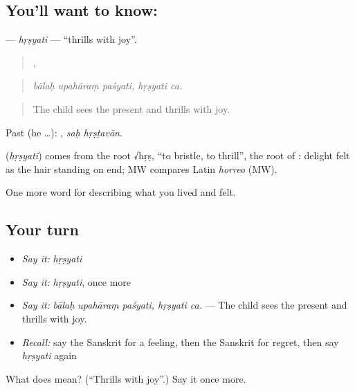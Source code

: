 \subsection*{You'll want to know: }
\textbf{} — \emph{hṛṣyati} — \textquotedblleft{}thrills with joy\textquotedblright{}.

\begin{quote}
  ,  
\end{quote}

\begin{quote}
\emph{bālaḥ upahāraṃ paśyati, hṛṣyati ca.}
\end{quote}

\begin{quote}
The child sees the present and thrills with joy.
\end{quote}

Past (he …):  , \emph{saḥ hṛṣṭavān}.

\begin{cousinweb}
\textbf{} (\emph{hṛṣyati}) comes from the root √hṛṣ, \textquotedblleft{}to bristle, to thrill\textquotedblright{}, the root of \textbf{}: delight felt as the hair standing on end; MW compares Latin \emph{horreo} (MW).
\end{cousinweb}

\begin{grammarlens}[title={What you've built}]
One more word for describing what you lived and felt.
\end{grammarlens}

\subsection*{Your turn}
\begin{itemize}
\raggedright
  \item \emph{Say it:} \emph{hṛṣyati}
  \item \emph{Say it:} \emph{hṛṣyati}, once more
  \item \emph{Say it:} \emph{bālaḥ upahāraṃ paśyati, hṛṣyati ca.} — The child sees the present and thrills with joy.
  \item \emph{Recall:} say the Sanskrit for a feeling, then the Sanskrit for regret, then say \emph{hṛṣyati} again
\end{itemize}

\begin{tcolorbox}[breakable,colback=teal!4,colframe=teal!35!black,title={Before you move on}]
What does  mean? (\textquotedblleft{}Thrills with joy\textquotedblright{}.) Say it once more.
\end{tcolorbox}
